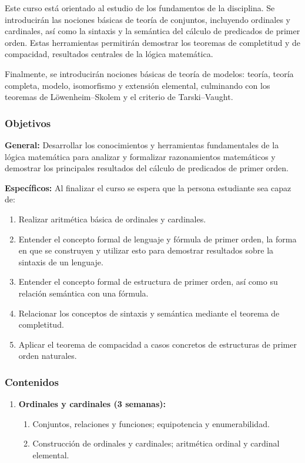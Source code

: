 \begin{refsection}
Este curso está orientado al estudio de los fundamentos de la disciplina. Se introducirán las nociones básicas de teoría de conjuntos, incluyendo ordinales y cardinales, así como la sintaxis y la semántica del cálculo de predicados de primer orden. Estas herramientas permitirán demostrar los teoremas de completitud y de compacidad, resultados centrales de la lógica matemática.

Finalmente, se introducirán nociones básicas de teoría de modelos: teoría, teoría completa, modelo, isomorfismo y extensión elemental, culminando con los teoremas de Löwenheim--Skolem y el criterio de Tarski--Vaught.

\subsubsection*{Objetivos}

\textbf{General:} Desarrollar los conocimientos y herramientas fundamentales de la lógica matemática para analizar y formalizar razonamientos matemáticos y demostrar los principales resultados del cálculo de predicados de primer orden.

\textbf{Específicos:} Al finalizar el curso se espera que la persona estudiante sea capaz de:

\begin{enumerate}
\item Realizar aritmética básica de ordinales y cardinales.
\item Entender el concepto formal de lenguaje y fórmula de primer orden, la forma en que se construyen y utilizar esto para demostrar resultados sobre la sintaxis de un lenguaje.
\item Entender el concepto formal de estructura de primer orden, así como su relación semántica con una fórmula.
\item Relacionar los conceptos de sintaxis y semántica mediante el teorema de completitud.
\item Aplicar el teorema de compacidad a casos concretos de estructuras de primer orden naturales.
\end{enumerate}

\subsubsection*{Contenidos}

\begin{enumerate}

\item \textbf{Ordinales y cardinales (3 semanas):}
\begin{enumerate}
    \item Conjuntos, relaciones y funciones; equipotencia y enumerabilidad.
    \item Construcción de ordinales y cardinales; aritmética ordinal y cardinal elemental.
\end{enumerate}


\end{enumerate}
\end{refsection}
